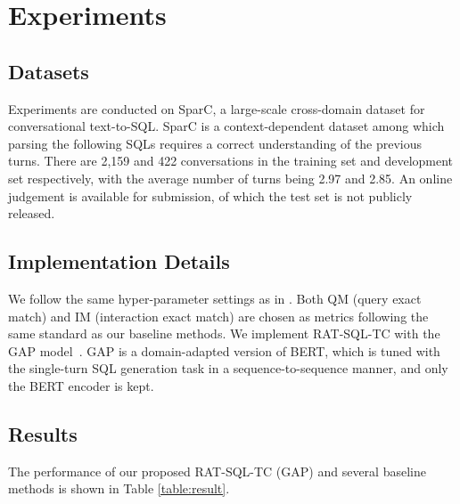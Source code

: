 \documentclass[a4paper]{article}
\begin{document}
\section{Experiments}

\subsection{Datasets}

Experiments are conducted on SparC, a large-scale cross-domain dataset for conversational text-to-SQL. SparC is a context-dependent dataset among which parsing the following SQLs requires a correct understanding of the previous turns. There are 2,159 and 422 conversations in the training set and development set respectively, with the average number of turns being 2.97 and 2.85. An online judgement is available for submission, of which the test set is not publicly released. 

\subsection{Implementation Details}

We follow the same hyper-parameter settings as in \cite{shi2020learning}. Both QM (query exact match) and IM (interaction exact match) are chosen as metrics following the same standard as our baseline methods. We implement RAT-SQL-TC with the GAP model~\cite{shi2020learning}. GAP is a domain-adapted version of BERT, which is tuned with the single-turn SQL generation task in a sequence-to-sequence manner, and only the BERT encoder is kept.

\subsection{Results}

The performance of our proposed RAT-SQL-TC (GAP) and several baseline methods is shown in Table \ref{table:result}.
\end{document}
